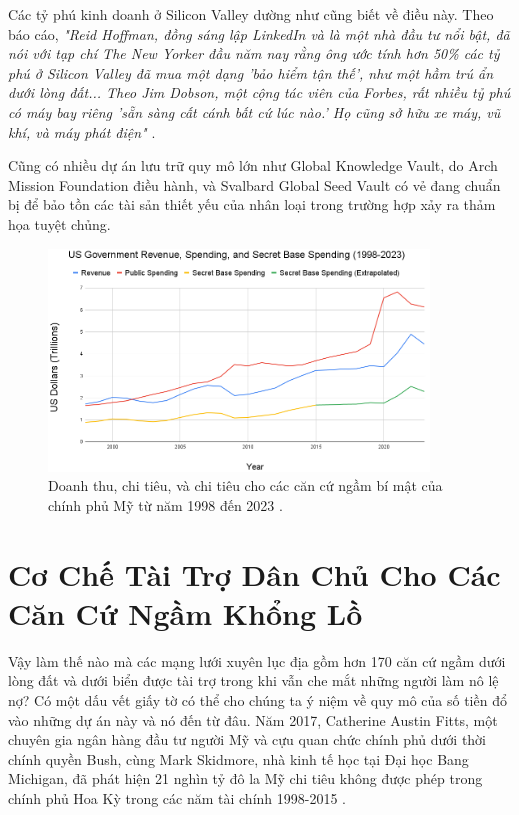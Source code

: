\documentclass[10pt,twocolumn,letterpaper]{article}
\begin{document}
Các tỷ phú kinh doanh ở Silicon Valley dường như cũng biết về điều này. Theo báo cáo, \textit{"Reid Hoffman, đồng sáng lập LinkedIn và là một nhà đầu tư nổi bật, đã nói với tạp chí The New Yorker đầu năm nay rằng ông ước tính hơn 50\% các tỷ phú ở Silicon Valley đã mua một dạng 'bảo hiểm tận thế', như một hầm trú ẩn dưới lòng đất... Theo Jim Dobson, một cộng tác viên của Forbes, rất nhiều tỷ phú có máy bay riêng 'sẵn sàng cất cánh bất cứ lúc nào.' Họ cũng sở hữu xe máy, vũ khí, và máy phát điện"} \cite{28}.

Cũng có nhiều dự án lưu trữ quy mô lớn như Global Knowledge Vault, do Arch Mission Foundation điều hành, \cite{29} và Svalbard Global Seed Vault \cite{30} có vẻ đang chuẩn bị để bảo tồn các tài sản thiết yếu của nhân loại trong trường hợp xảy ra thảm họa tuyệt chủng.

\begin{figure}[t]
\begin{center}
\includegraphics[width=0.9\textwidth]{govcrop2.png}
\end{center}
   \caption{Doanh thu, chi tiêu, và chi tiêu cho các căn cứ ngầm bí mật của chính phủ Mỹ từ năm 1998 đến 2023 \cite{19}.}
   \label{fig:9}
\end{figure}
\section{Cơ Chế Tài Trợ Dân Chủ Cho Các Căn Cứ Ngầm Khổng Lồ}

Vậy làm thế nào mà các mạng lưới xuyên lục địa gồm hơn 170 căn cứ ngầm dưới lòng đất và dưới biển được tài trợ trong khi vẫn che mắt những người làm nô lệ nợ? Có một dấu vết giấy tờ có thể cho chúng ta ý niệm về quy mô của số tiền đổ vào những dự án này và nó đến từ đâu. Năm 2017, Catherine Austin Fitts, một chuyên gia ngân hàng đầu tư người Mỹ và cựu quan chức chính phủ dưới thời chính quyền Bush, cùng Mark Skidmore, nhà kinh tế học tại Đại học Bang Michigan, đã phát hiện 21 nghìn tỷ đô la Mỹ chi tiêu không được phép trong chính phủ Hoa Kỳ trong các năm tài chính 1998-2015 \cite{11,12,13}.
\end{document}

